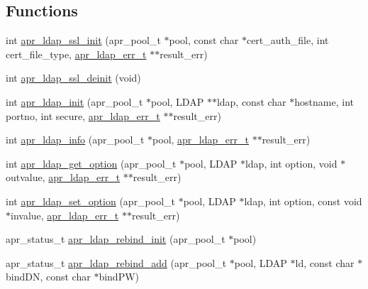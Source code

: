\subsection*{Functions}
\begin{DoxyCompactItemize}
\item 
int \hyperlink{group___a_p_r___util___l_d_a_p_ga8530e90ca597f822a571b6813021e1f1}{apr\-\_\-ldap\-\_\-ssl\-\_\-init} (apr\-\_\-pool\-\_\-t $\ast$pool, const char $\ast$cert\-\_\-auth\-\_\-file, int cert\-\_\-file\-\_\-type, \hyperlink{structapr__ldap__err__t}{apr\-\_\-ldap\-\_\-err\-\_\-t} $\ast$$\ast$result\-\_\-err)
\item 
int \hyperlink{group___a_p_r___util___l_d_a_p_ga4425baf721f1857e0d8e066076aa595c}{apr\-\_\-ldap\-\_\-ssl\-\_\-deinit} (void)
\item 
int \hyperlink{group___a_p_r___util___l_d_a_p_ga9b7929b5fafe485a79cb83273ef8de43}{apr\-\_\-ldap\-\_\-init} (apr\-\_\-pool\-\_\-t $\ast$pool, L\-D\-A\-P $\ast$$\ast$ldap, const char $\ast$hostname, int portno, int secure, \hyperlink{structapr__ldap__err__t}{apr\-\_\-ldap\-\_\-err\-\_\-t} $\ast$$\ast$result\-\_\-err)
\item 
int \hyperlink{group___a_p_r___util___l_d_a_p_ga59cae74d6182dea8d93080b602845866}{apr\-\_\-ldap\-\_\-info} (apr\-\_\-pool\-\_\-t $\ast$pool, \hyperlink{structapr__ldap__err__t}{apr\-\_\-ldap\-\_\-err\-\_\-t} $\ast$$\ast$result\-\_\-err)
\item 
int \hyperlink{group___a_p_r___util___l_d_a_p_gaaeff4c9127a45e467490f8fb7648e946}{apr\-\_\-ldap\-\_\-get\-\_\-option} (apr\-\_\-pool\-\_\-t $\ast$pool, L\-D\-A\-P $\ast$ldap, int option, void $\ast$outvalue, \hyperlink{structapr__ldap__err__t}{apr\-\_\-ldap\-\_\-err\-\_\-t} $\ast$$\ast$result\-\_\-err)
\item 
int \hyperlink{group___a_p_r___util___l_d_a_p_gada266c693bc5ad7a336bd3965a09b7ba}{apr\-\_\-ldap\-\_\-set\-\_\-option} (apr\-\_\-pool\-\_\-t $\ast$pool, L\-D\-A\-P $\ast$ldap, int option, const void $\ast$invalue, \hyperlink{structapr__ldap__err__t}{apr\-\_\-ldap\-\_\-err\-\_\-t} $\ast$$\ast$result\-\_\-err)
\item 
apr\-\_\-status\-\_\-t \hyperlink{group___a_p_r___util___l_d_a_p_ga465eeada97b097be91505534a319a001}{apr\-\_\-ldap\-\_\-rebind\-\_\-init} (apr\-\_\-pool\-\_\-t $\ast$pool)
\item 
apr\-\_\-status\-\_\-t \hyperlink{group___a_p_r___util___l_d_a_p_gaadf4bef6259aa733246e767cddde80ef}{apr\-\_\-ldap\-\_\-rebind\-\_\-add} (apr\-\_\-pool\-\_\-t $\ast$pool, L\-D\-A\-P $\ast$ld, const char $\ast$bind\-D\-N, const char $\ast$bind\-P\-W)

\end{DoxyCompactItemize}
